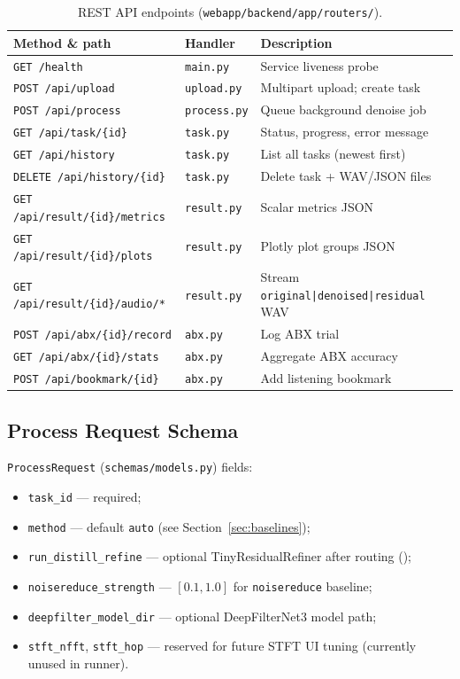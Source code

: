 \begin{table}[H]
  \centering
  \caption{REST API endpoints (\texttt{webapp/backend/app/routers/}).}
  \label{tab:api_endpoints}
  \footnotesize
  \begin{tabularx}{\textwidth}{l l X}
    \toprule
    \textbf{Method \& path} & \textbf{Handler} & \textbf{Description} \\
    \midrule
    \texttt{GET /health} & \texttt{main.py} & Service liveness probe \\
    \texttt{POST /api/upload} & \texttt{upload.py} & Multipart upload; create task \\
    \texttt{POST /api/process} & \texttt{process.py} & Queue background denoise job \\
    \texttt{GET /api/task/\{id\}} & \texttt{task.py} & Status, progress, error message \\
    \texttt{GET /api/history} & \texttt{task.py} & List all tasks (newest first) \\
    \texttt{DELETE /api/history/\{id\}} & \texttt{task.py} & Delete task + WAV/JSON files \\
    \texttt{GET /api/result/\{id\}/metrics} & \texttt{result.py} & Scalar metrics JSON \\
    \texttt{GET /api/result/\{id\}/plots} & \texttt{result.py} & Plotly plot groups JSON \\
    \texttt{GET /api/result/\{id\}/audio/*} & \texttt{result.py} & Stream \texttt{original|denoised|residual} WAV \\
    \texttt{POST /api/abx/\{id\}/record} & \texttt{abx.py} & Log ABX trial \\
    \texttt{GET /api/abx/\{id\}/stats} & \texttt{abx.py} & Aggregate ABX accuracy \\
    \texttt{POST /api/bookmark/\{id\}} & \texttt{abx.py} & Add listening bookmark \\
    \bottomrule
  \end{tabularx}
\end{table}

\subsection{Process Request Schema}

\texttt{ProcessRequest} (\texttt{schemas/models.py}) fields:
\begin{itemize}
  \item \texttt{task\_id} --- required;
  \item \texttt{method} --- default \texttt{auto} (see Section~\ref{sec:baselines});
  \item \texttt{run\_distill\_refine} --- optional TinyResidualRefiner after routing ();
  \item \texttt{noisereduce\_strength} --- $[0.1,1.0]$ for \texttt{noisereduce} baseline;
  \item \texttt{deepfilter\_model\_dir} --- optional DeepFilterNet3 model path;
  \item \texttt{stft\_nfft}, \texttt{stft\_hop} --- reserved for future STFT UI tuning (currently unused in runner).
\end{itemize}

